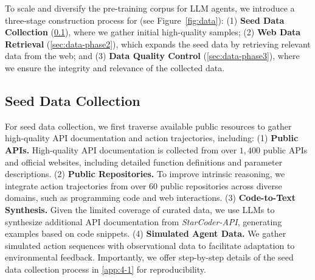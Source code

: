 To scale and diversify the pre-training corpus for LLM agents, we introduce a three-stage construction process for \dataset (see Figure~\ref{fig:data}): (1) \textbf{Seed Data Collection} (\cref{sec:data-phase1}), where we gather initial high-quality samples; (2) \textbf{Web Data Retrieval} (\cref{sec:data-phase2}), which expands the seed data by retrieving relevant data from the web; and (3) \textbf{Data Quality Control} (\cref{sec:data-phase3}), where we ensure the integrity and relevance of the collected data. 

\subsection{Seed Data Collection}
\label{sec:data-phase1}

For seed data collection, we first traverse available public resources to gather high-quality API documentation and action trajectories, including: 
(1) \textbf{Public APIs.} High-quality API documentation is collected from over $1,400$ public APIs and official websites, including detailed function definitions and parameter descriptions. 
(2) \textbf{Public Repositories.} To improve intrinsic reasoning, we integrate action trajectories from over $60$ public repositories across diverse domains, such as programming code and web interactions. 
(3) \textbf{Code-to-Text Synthesis.} Given the limited coverage of curated data, we use LLMs to synthesize additional API documentation from \emph{StarCoder-API}, generating examples based on code snippets. 
(4) \textbf{Simulated Agent Data.} We gather simulated action sequences with observational data to facilitate adaptation to environmental feedback. 
Importantly, we offer step-by-step details of the seed data collection process in \cref{app:4-1} for reproducibility.



